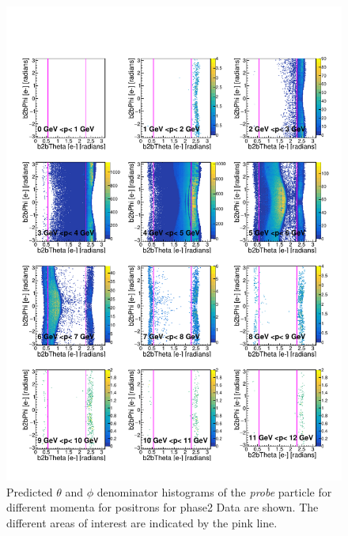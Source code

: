 \documentclass[a4paper,11pt,twosided,final,german,openbib,pdftex,listof=totoc,bibliography=totoc]{scrbook}
\begin{document}
\begin{appendix}
\begin{figure}[h!]
	\includegraphics[width=\textwidth]{Plots/master/RTPMepD_Data.pdf}
	\caption[Denominator $\theta$-$\phi$ Positron Momentum Phase2 Data]{Predicted $\theta$ and $\phi$ denominator histograms of the \textit{probe} particle for different momenta for positrons for phase2 Data are shown. The different areas of interest are indicated by the pink line.}
	\label{plt:RTPMepD_Data}
\end{figure}



\end{appendix}
\end{document}

